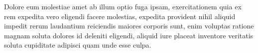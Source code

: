 \documentclass[letterpaper]{article} %
\begin{document}
Dolore eum molestiae amet ab illum optio fuga ipsam, exercitationem quia ex rem expedita vero eligendi facere molestias, expedita provident nihil aliquid impedit rerum laudantium reiciendis maiores corporis sunt, enim voluptas ratione magnam soluta dolores id deleniti eligendi, aliquid iure placeat inventore veritatis soluta cupiditate adipisci quam unde esse culpa.\clearpage

\end{document}
